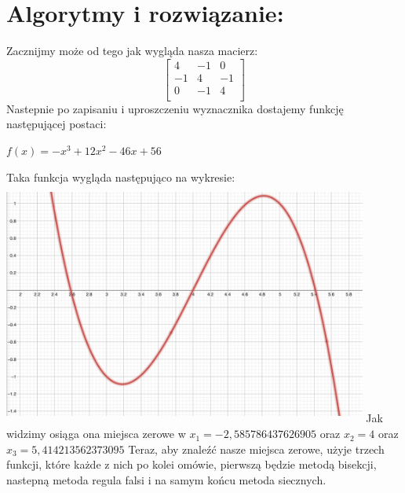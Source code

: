 \documentclass[12pt]{article}
\begin{document}
\section{Algorytmy i rozwiązanie: }
Zacznijmy może od tego jak wygląda nasza macierz:
\[
\begin{bmatrix}
    4 & -1 & 0 \\
    -1 & 4 & -1 \\ 
    0 & -1 & 4 \\
\end{bmatrix}
\]
Nastepnie po zapisaniu i uproszczeniu wyznacznika dostajemy funkcję następującej postaci:
\begin{center}
    \begin{math}
        f(x) = -x^{3}+12x^{2}-46x+56
    \end{math}
\end{center}
Taka funkcja wygląda następująco na wykresie:
\newline
\includegraphics[width=12cm,height=8cm, keepaspectratio]{wykres_funkcja.png}
\newline
Jak widzimy osiąga ona miejsca zerowe w $x_{1} = -2,585786437626905$ oraz $x_{2} = 4$ oraz $x_{3} = 5,414213562373095$
\newline
Teraz, aby znaleźć nasze miejsca zerowe, użyje trzech funkcji, które każde z nich po kolei omówie, pierwszą będzie metodą bisekcji, nastepną metoda regula falsi i na samym końcu metoda siecznych. 
\end{document}
